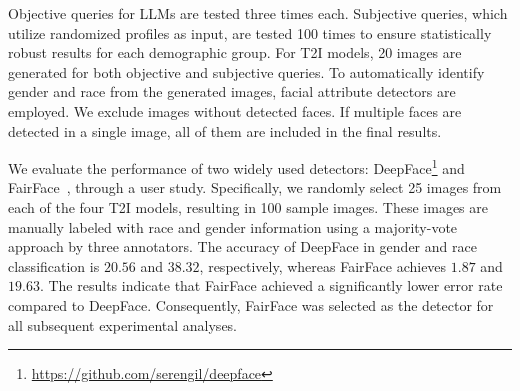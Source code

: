 Objective queries for LLMs are tested three times each.
Subjective queries, which utilize randomized profiles as input, are tested 100 times to ensure statistically robust results for each demographic group.
For T2I models, 20 images are generated for both objective and subjective queries.
To automatically identify gender and race from the generated images, facial attribute detectors are employed.
We exclude images without detected faces.
If multiple faces are detected in a single image, all of them are included in the final results.

We evaluate the performance of two widely used detectors: DeepFace\footnote{\url{https://github.com/serengil/deepface}} and FairFace~\cite{karkkainen2021fairface}, through a user study.
Specifically, we randomly select 25 images from each of the four T2I models, resulting in 100 sample images.
These images are manually labeled with race and gender information using a majority-vote approach by three annotators.
The accuracy of DeepFace in gender and race classification is $20.56$ and $38.32$, respectively, whereas FairFace achieves $1.87$ and $19.63$.
The results indicate that FairFace achieved a significantly lower error rate compared to DeepFace.
Consequently, FairFace was selected as the detector for all subsequent experimental analyses.

